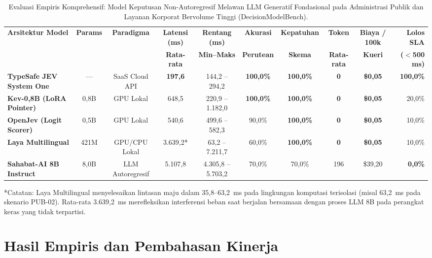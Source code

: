 \documentclass[journal,compsoc]{IEEEtran}
\begin{document}
\begin{table}[t]
\caption{Evaluasi Empiris Komprehensif: Model Keputusan Non-Autoregresif Melawan LLM Generatif Fondasional pada Administrasi Publik dan Layanan Korporat Bervolume Tinggi (DecisionModelBench).}
\label{tab:hasil_empiris_cs}
\centering
\footnotesize
\setlength{\tabcolsep}{2pt}
\begin{tabular*}{\textwidth}{@{\extracolsep{\fill}}lccccccccr@{}}
\toprule
\textbf{Arsitektur Model} & \textbf{Params} & \textbf{Paradigma} & \textbf{Latensi (ms)} & \textbf{Rentang (ms)} & \textbf{Akurasi} & \textbf{Kepatuhan} & \textbf{Token} & \textbf{Biaya / 100k} & \textbf{Lolos SLA} \\
 & & & \textbf{Rata-rata} & \textbf{Min--Maks} & \textbf{Perutean} & \textbf{Skema} & \textbf{Rata-rata} & \textbf{Kueri} & \textbf{($<$500 ms)} \\
\midrule
\textbf{TypeSafe JEV System One} & --- & SaaS Cloud API & \textbf{197,6} & 144,2 -- 294,2 & \textbf{100,0\%} & \textbf{100,0\%} & \textbf{0} & \textbf{\$0,05} & \textbf{100,0\%} \\
\textbf{Kev-0,8B (LoRA Pointer)} & 0,8B & GPU Lokal & 648,5 & 220,9 -- 1.182,0 & \textbf{100,0\%} & \textbf{100,0\%} & \textbf{0} & \textbf{\$0,05} & 20,0\% \\
\textbf{OpenJev (Logit Scorer)} & 0,5B & GPU Lokal & 540,6 & 499,6 -- 582,3 & 90,0\% & \textbf{100,0\%} & \textbf{0} & \textbf{\$0,05} & 10,0\% \\
\textbf{Laya Multilingual} & 421M & GPU/CPU Lokal & 3.639,2* & 63,2 -- 7.211,7 & 60,0\% & \textbf{100,0\%} & \textbf{0} & \textbf{\$0,05} & 10,0\% \\
\midrule
\textbf{Sahabat-AI 8B Instruct} & 8,0B & LLM Autoregresif & 5.107,8 & 4.305,8 -- 5.703,2 & 70,0\% & 70,0\% & 196 & \$39,20 & \textbf{0,0\%} \\
\bottomrule
\end{tabular*}
\vspace{1ex}
\begin{flushleft}
\footnotesize{*Catatan: Laya Multilingual menyelesaikan lintasan maju dalam 35,8--63,2~ms pada lingkungan komputasi terisolasi (misal 63,2~ms pada skenario PUB-02). Rata-rata 3.639,2~ms merefleksikan interferensi beban saat berjalan bersamaan dengan proses LLM 8B pada perangkat keras yang tidak terpartisi.}
\end{flushleft}
\end{table}

\section{Hasil Empiris dan Pembahasan Kinerja}
\end{document}
